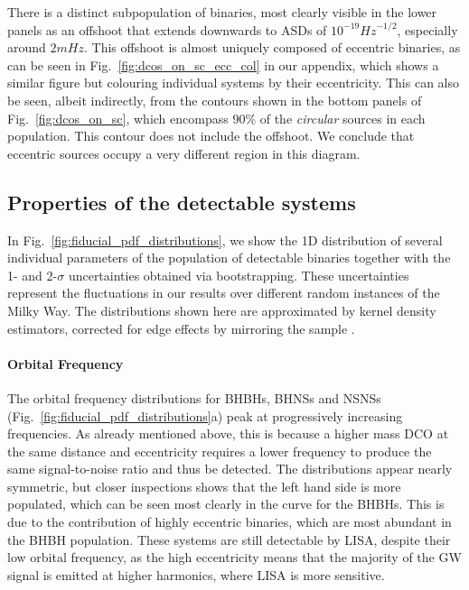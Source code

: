 There is a distinct subpopulation of binaries, most clearly visible in the lower panels as an offshoot that extends downwards to ASDs of $10^{-19} \unit{Hz}^{-1/2}$, especially around $2 \unit{mHz}$. This offshoot is almost uniquely composed of eccentric binaries, as can be seen in Fig.~\ref{fig:dcos_on_sc_ecc_col} in our appendix, which shows a similar figure but colouring individual systems by their eccentricity. This can also be seen, albeit indirectly, from the contours shown in the bottom panels of Fig.~\ref{fig:dcos_on_sc}, which encompass 90\% of the \textit{circular} sources in each population. This contour does not include the offshoot. We conclude that eccentric sources occupy a very different region in this diagram.

\subsection{Properties of the detectable systems}\label{sec:fiducial_distributions}
In Fig.~\ref{fig:fiducial_pdf_distributions}, we show the 1D distribution of several individual parameters of the population of detectable binaries together with the 1- and 2-$\sigma$ uncertainties obtained via bootstrapping. These uncertainties represent the fluctuations in our results over different random instances of the Milky Way. The distributions shown here are approximated by kernel density estimators, corrected for edge effects by mirroring the sample \citep{Schuster+1985}.

\paragraph{Orbital Frequency} The orbital frequency distributions for BHBHs, BHNSs and NSNSs (Fig.~\ref{fig:fiducial_pdf_distributions}a) peak at progressively increasing frequencies. As already mentioned above, this is because a higher mass DCO at the same distance and eccentricity requires a lower frequency to produce the same signal-to-noise ratio and thus be detected. The distributions appear nearly symmetric, but closer inspections shows that the left hand side is more populated, which can be seen most clearly in the curve for the BHBHs. This is due to the contribution of highly eccentric binaries, which are most abundant in the BHBH population. These systems are still detectable by LISA, despite their low orbital frequency, as the high eccentricity means that the majority of the GW signal is emitted at higher harmonics, where LISA is more sensitive.

